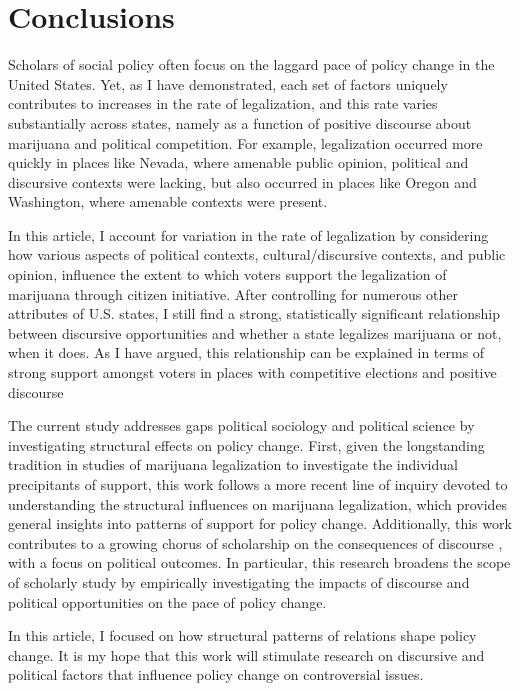 \section{Conclusions}

Scholars of social policy often focus on the laggard pace of policy change in the United States. 
Yet, as I have demonstrated, each set of factors uniquely contributes to increases in the rate of legalization, and this rate varies substantially across states, namely as a function of positive discourse about marijuana and political competition. For example, legalization occurred more quickly in places like Nevada, where amenable public opinion, political and discursive contexts were lacking, but also occurred in places like Oregon and Washington, where amenable contexts were present. %

In this article, I account for variation in the rate of legalization by considering how various aspects of political contexts, cultural/discursive contexts, and public opinion, influence the extent to which voters support the legalization of marijuana through citizen initiative. After controlling for numerous other attributes of U.S. states, I still find a strong, statistically significant relationship between discursive opportunities and whether a state legalizes marijuana or not, when it does. As I have argued, this relationship can be explained in terms of strong support amongst voters in places with competitive elections and positive discourse

The current study addresses gaps political sociology and political science by investigating  structural effects on policy change. First, given the longstanding tradition in studies of marijuana legalization to investigate the individual precipitants of support, this work follows a more recent line of inquiry devoted to understanding the structural influences on marijuana legalization, which provides general insights into patterns of support for policy change. Additionally, this work contributes to a growing chorus of scholarship on the consequences of discourse \citep{bail_2012,vasi_et_al_2015}, with a focus on political outcomes. In particular, this research broadens the scope of scholarly study by empirically investigating the impacts of discourse and political opportunities on the pace of policy change. 

In this article, I focused on how structural patterns of relations shape policy change. It is my hope that this work will stimulate research on discursive and political factors that influence policy change on controversial issues.

